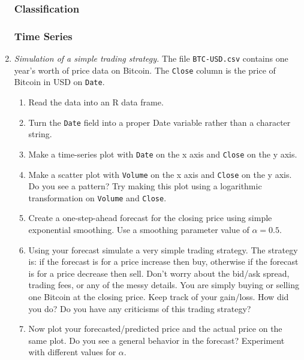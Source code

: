 \begin{enumerate}
\subsubsection*{Classification}

\subsubsection*{Time Series}

\item \emph{Simulation of a simple trading strategy.}
  The file \texttt{BTC-USD.csv} contains one year's worth of price
  data on Bitcoin. The \texttt{Close} column is the price of
  Bitcoin in USD on \texttt{Date}. 

\begin{enumerate}
\item Read the data into an R data frame.
\item Turn the \texttt{Date} field into a proper Date variable rather
  than a character string.
\item Make a time-series plot with \texttt{Date} on the x axis and
  \texttt{Close} on the y axis.
\item Make a scatter plot with \texttt{Volume} on the x axis and
  \texttt{Close} on the y axis. Do you see a pattern? Try making
  this plot using a logarithmic transformation on \texttt{Volume} and
  \texttt{Close}.
\item Create a one-step-ahead forecast for the closing price using
  simple exponential smoothing. Use a smoothing parameter value
  of $\alpha = 0.5$.
\item Using your forecast simulate a very simple trading strategy.
  The strategy is: if the forecast is for a price increase then buy,
  otherwise if the forecast is for a price decrease then sell. Don't
  worry about the bid/ask spread, trading fees, or any of the messy
  details. You are simply buying or selling one Bitcoin at the closing
  price. Keep track of your gain/loss. How did you do? Do you
  have any criticisms of this trading strategy?
\item  Now plot your forecasted/predicted price and the actual price
  on the same plot. Do you see a general behavior in the forecast?
  Experiment with different values for $\alpha$.
\end{enumerate}
  
\end{enumerate}

